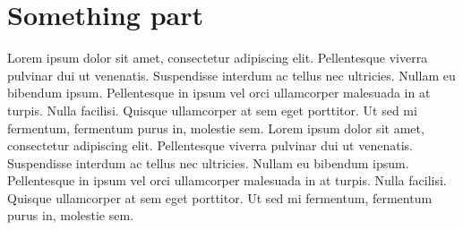 \documentclass[../main.tex]{subfiles}
\begin{document}
	\vspace{10pt}

	\section{Something part}


Lorem ipsum dolor sit amet, consectetur adipiscing elit. Pellentesque viverra pulvinar dui ut venenatis.
Suspendisse interdum ac tellus nec ultricies. Nullam eu bibendum ipsum. Pellentesque in ipsum vel orci 
ullamcorper malesuada in at turpis. Nulla facilisi. Quisque ullamcorper at sem eget porttitor. Ut sed mi fermentum, 
fermentum purus in, molestie sem.
Lorem ipsum dolor sit amet, consectetur adipiscing elit. Pellentesque viverra pulvinar dui ut venenatis.
Suspendisse interdum ac tellus nec ultricies. Nullam eu bibendum ipsum. Pellentesque in ipsum vel orci 
ullamcorper malesuada in at turpis. Nulla facilisi. Quisque ullamcorper at sem eget porttitor. Ut sed mi fermentum, 
fermentum purus in, molestie sem.

	\vspace{10pt}
\end{document}

